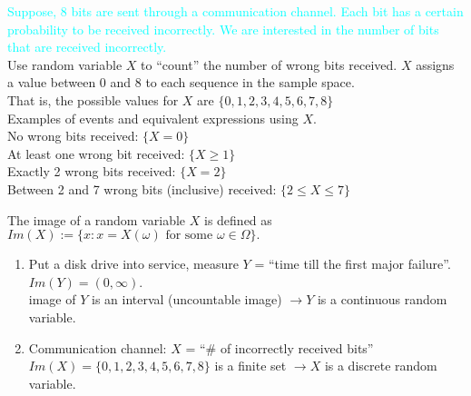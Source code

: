 \documentclass[20pt,landscape]{foils}
\newcommand{\no}{\noindent}
\newcommand{\bul}{\hspace*{.3in}{\textcolor{red}{$\bullet$ \ }}}
\begin{document}
{{{   
\foilhead[-.8in]{\textcolor{blue}{Practice with notation}}   
\no   {\textcolor{magenta}{Example}} {\textcolor{cyan}{Suppose, 8 bits are sent through a communication channel.
Each bit has a certain probability to be received incorrectly. We are interested in the number of bits that are received incorrectly.}}\\[.1in]
\no Use random variable $X$ to ``count'' the number of wrong bits received.
 $X$ assigns a value between 0 and 8 to each sequence in the sample space.\\[.1in]
\no That is, the possible values for $X$  are $\{0,1,2,3,4,5,6,7,8\}$\\[.1in]
\no Examples of events and equivalent expressions using $X$. \\[.1in]
\bul No wrong bits received: $\{X=0\}$\\[.1in]
\bul At least one wrong bit received: $\{X\geq 1\}$\\[.1in]
\bul Exactly 2 wrong bits received: $\{X=2\}$\\[.1in]
\bul Between 2 and 7 wrong bits (inclusive) received: $\{2\leq X\leq 7\}$   
     
\foilhead[-.8in]{\textcolor{blue}{Image of R.V.: all possible values $X$ can take}}
\no {\textcolor{magenta}{Definition:}} The image of a random variable $X$ is defined as
\no \hspace*{1in} $Im(X) := \{x: x=X(\omega) \text{ for some }\omega \in \Omega \}.$ \\[.1in]
   \begin{enumerate}
	\item Put a disk drive into service, measure $Y$ = ``time till
	the first major failure''.\\[.1in]
		$Im(Y) = (0, \infty)$.\\[.1in]
    image of $Y$ is an interval (uncountable image) $\rightarrow Y$ is a
  continuous random variable.
	\item Communication channel: $X$ = ``\# of incorrectly received bits''\\[.1in]
		$Im(X) = \{ 0,1,2,3,4,5,6,7,8 \}$ is a finite set $\rightarrow X$ is
	a discrete random variable.
    \end{enumerate}
    
    
    
}}}
\end{document}
